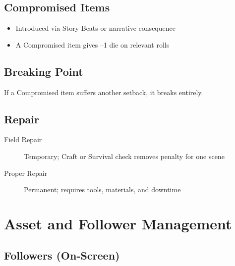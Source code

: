 \subsection{Compromised Items}

\begin{itemize}
\item Introduced via Story Beats or narrative consequence
\item A Compromised item gives --1 die on relevant rolls
\end{itemize}

\subsection{Breaking Point}
If a Compromised item suffers another setback, it breaks entirely.

\subsection{Repair}

\begin{description}
\item[Field Repair] Temporary; Craft or Survival check removes penalty for one scene
\item[Proper Repair] Permanent; requires tools, materials, and downtime
\end{description}

\section{Asset and Follower Management}

\subsection{Followers (On-Screen)}

